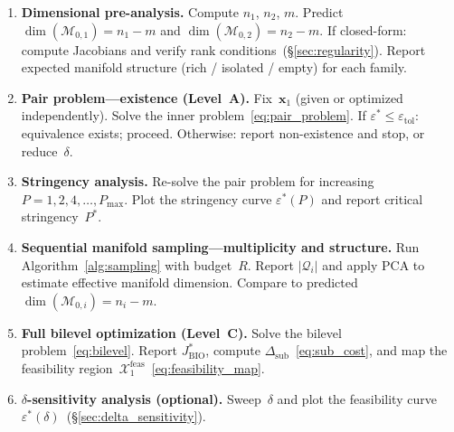 \begin{enumerate}[label=\textbf{Step \arabic*}, leftmargin=*, itemsep=6pt]

    \item \textbf{Dimensional pre-analysis.}
    Compute $n_1$, $n_2$, $m$.
    Predict $\dim(\mathcal{M}_{0,1}) = n_1 - m$ and $\dim(\mathcal{M}_{0,2}) = n_2 - m$.
    If closed-form: compute Jacobians and verify rank conditions~(\S\ref{sec:regularity}).
    Report expected manifold structure (rich / isolated / empty) for each family.

    \item \textbf{Pair problem---existence (Level~A).}
    Fix~$\mathbf{x}_1$ (given or optimized independently).
    Solve the inner problem~\eqref{eq:pair_problem}.
    If $\varepsilon^* \leq \varepsilon_{\mathrm{tol}}$: equivalence exists; proceed.
    Otherwise: report non-existence and stop, or reduce~$\delta$.

    \item \textbf{Stringency analysis.}
    Re-solve the pair problem for increasing~$P = 1, 2, 4, \ldots, P_{\max}$.
    Plot the stringency curve $\varepsilon^*(P)$ and report critical stringency~$P^*$.

    \item \textbf{Sequential manifold sampling---multiplicity and structure.}
    Run Algorithm~\ref{alg:sampling} with budget~$R$.
    Report $|\mathcal{Q}_i|$ and apply PCA to estimate effective manifold dimension.
    Compare to predicted $\dim(\mathcal{M}_{0,i}) = n_i - m$.

    \item \textbf{Full bilevel optimization (Level~C).}
    Solve the bilevel problem~\eqref{eq:bilevel}.
    Report $J_{\mathrm{BIO}}^*$, compute $\Delta_{\mathrm{sub}}$~\eqref{eq:sub_cost}, and map the feasibility region~$\mathcal{X}_1^{\mathrm{feas}}$~\eqref{eq:feasibility_map}.

    \item \textbf{$\delta$-sensitivity analysis (optional).}
    Sweep~$\delta$ and plot the feasibility curve $\varepsilon^*(\delta)$~(\S\ref{sec:delta_sensitivity}).

\end{enumerate}
